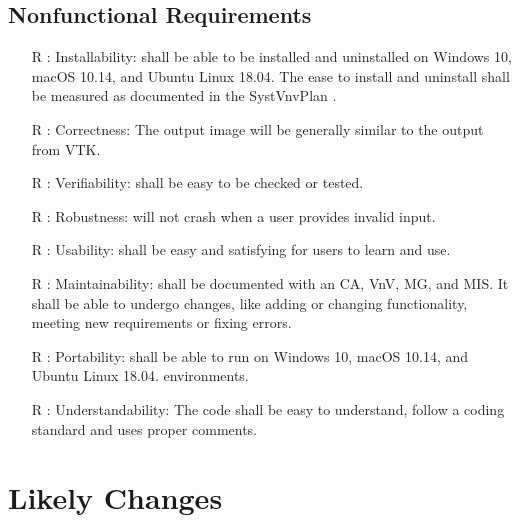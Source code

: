 \documentclass[12pt]{article}
\begin{document}
\subsection{Nonfunctional Requirements}

\begin{itemize}
\item[R\refstepcounter{reqnum}\thereqnum
\label{R_install}:]
Installability: \progname{} shall be able to be installed and uninstalled on
Windows 10, macOS 10.14, and Ubuntu Linux 18.04. The ease to install and
uninstall shall be measured as documented in the SystVnvPlan \cite{Dong2019SystVnv}.
\item[R\refstepcounter{reqnum}\thereqnum
\label{R_correct}:]
Correctness: The output image will be generally similar to the output from VTK.
\item[R\refstepcounter{reqnum}\thereqnum
\label{R_verify}:]
Verifiability: \progname{} shall be easy to be checked or tested.
\item[R\refstepcounter{reqnum}\thereqnum
\label{R_robust}:]
Robustness: \progname{} will not crash when a user provides invalid input.
\item[R\refstepcounter{reqnum}\thereqnum
\label{R_use}:]
Usability: \progname{} shall be easy and satisfying for users to learn and use.
\item[R\refstepcounter{reqnum}\thereqnum
\label{R_maintain}:]
Maintainability: \progname{} shall be documented with an CA, VnV, MG, and MIS.
It shall be able to undergo changes, like adding or changing functionality,
meeting new requirements or fixing errors.
\item[R\refstepcounter{reqnum}\thereqnum
\label{R_portal}:]
Portability: \progname{} shall be able to run on Windows 10, macOS 10.14, and
Ubuntu Linux 18.04.
environments.
\item[R\refstepcounter{reqnum}\thereqnum
\label{R_understand}:]
Understandability: The code shall be easy to understand, follow a coding
standard and uses proper comments.
\end{itemize}

\section{Likely Changes}
\end{document}
